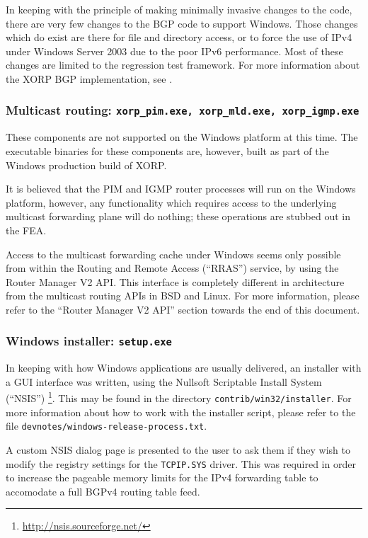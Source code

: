 \documentclass[11pt]{article}
\begin{document}
{In keeping with the principle of making minimally invasive changes to the code,
there are very few changes to the BGP code to support Windows. Those changes
which do exist are there for file and directory access, or to force the use
of IPv4 under Windows Server 2003 due to the poor IPv6 performance. Most
of these changes are limited to the regression test framework.
For more information about the XORP BGP implementation, see \cite{xorp:bgp}.

\subsubsection{Multicast routing: {\tt xorp\_pim.exe, xorp\_mld.exe, xorp\_igmp.exe}}

These components are not supported on the Windows platform at this time. The
executable binaries for these components are, however, built as part of the
Windows production build of XORP.

It is believed that the PIM and IGMP router processes will run on the Windows platform, however,
any functionality which requires access to the underlying multicast forwarding plane
will do nothing; these operations are stubbed out in the FEA.

Access to the multicast forwarding cache under Windows seems only possible from within
the Routing and Remote Access (``RRAS'') service, by using the Router Manager V2 API.
This interface is completely different in architecture from the multicast routing APIs
in BSD and Linux.
For more information, please refer to the ``Router Manager V2 API''
section towards the end of this document.

\subsubsection{Windows installer: {\tt setup.exe}}

In keeping with how Windows applications are usually delivered, an installer
with a GUI interface was written, using the Nullsoft Scriptable Install System (``NSIS'')
\footnote{\url{http://nsis.sourceforge.net/}}.
This may be found in the directory {\tt contrib/win32/installer}.
For more information about how to work with the installer script, please
refer to the file {\tt devnotes/windows-release-process.txt}.

A custom NSIS dialog page is presented to the user to ask them if they wish to
modify the registry settings for the {\tt TCPIP.SYS} driver. This was required in order
to increase the pageable memory limits for the IPv4 forwarding table to accomodate
a full BGPv4 routing table feed.

}
\end{document}
